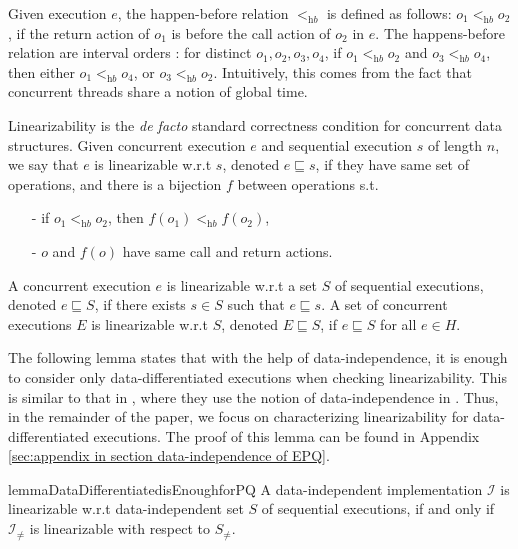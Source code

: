 Given execution $e$, the happen-before relation $<_{\textit{hb}}$ is defined as follows: $o_1 <_{\textit{hb}} o_2$, if the return action of $o_1$ is before the call action of $o_2$ in $e$. The happens-before relation are interval orders \cite{Bouajjani:2015POPL}: for distinct $o_1,o_2,o_3,o_4$, if $o_1 <_{\textit{hb}} o_2$ and $o_3 <_{\textit{hb}} o_4$, then either $o_1 <_{\textit{hb}} o_4$, or $o_3 <_{\textit{hb}} o_2$. Intuitively, this comes from the fact that concurrent threads share a notion of global time.

Linearizability \cite{Herlihy:1990} is the \emph{de facto} standard correctness condition for concurrent data structures. Given concurrent execution $e$ and sequential execution $s$ of length $n$, we say that $e$ is linearizable w.r.t $s$, denoted $e \sqsubseteq s$, if they have same set of operations, and there is a bijection $f$ between operations s.t.

\begin{itemize}
\item[-] if $o_1 <_{\textit{hb}} o_2$, then $f(o_1) <_{\textit{hb}} f(o_2)$,

\item[-] $o$ and $f(o)$ have same call and return actions.
\end{itemize}

A concurrent execution $e$ is linearizable w.r.t a set $S$ of sequential executions, denoted $e \sqsubseteq S$, if there exists $s \in S$ such that $e \sqsubseteq s$. A set of concurrent executions $E$ is linearizable w.r.t $S$, denoted $E \sqsubseteq S$, if $e \sqsubseteq S$ for all $e \in H$.

The following lemma states that with the help of data-independence, it is enough to consider only data-differentiated executions when checking linearizability. This is similar to that in \cite{Abdulla:2013}, where they use the notion of data-independence in \cite{Wolper:1986}. Thus, in the remainder of the paper, we focus on characterizing linearizability for data-differentiated executions. The proof of this lemma can be found in Appendix \ref{sec:appendix in section data-independence of EPQ}.

\begin{restatable}{lemma}{DataDifferentiatedisEnoughforPQ}
\label{lemma:data differentiated is enough for PQ}
A data-independent implementation $\mathcal{I}$ is linearizable w.r.t data-independent set $S$ of sequential executions, if and only if $\mathcal{I}_{\neq}$ is linearizable with respect to $S_{\neq}$.
\end{restatable}




